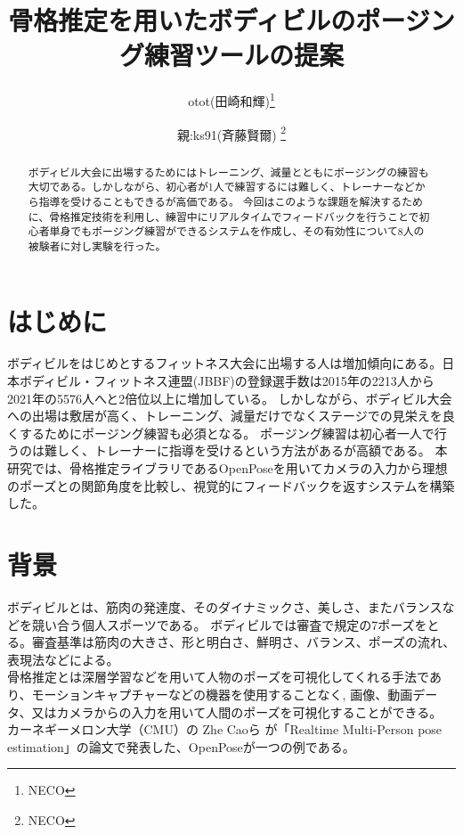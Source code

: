 \documentclass[a4j,10pt]{jsarticle}
\begin{document}

\title{骨格推定を用いたボディビルのポージング練習ツールの提案}

\author{
    otot(田崎和輝)\thanks{NECO}
    \and
    親:ks91(斉藤賢爾) \thanks{NECO}
}

\begin{abstract}
ボディビル大会に出場するためにはトレーニング、減量とともにポージングの練習も大切である。しかしながら、初心者が1人で練習するには難しく、トレーナーなどから指導を受けることもできるが高価である。
今回はこのような課題を解決するために、骨格推定技術を利用し、練習中にリアルタイムでフィードバックを行うことで初心者単身でもポージング練習ができるシステムを作成し、その有効性について8人の被験者に対し実験を行った。

\end{abstract}

\maketitle

\section{はじめに}
ボディビルをはじめとするフィットネス大会に出場する人は増加傾向にある。日本ボディビル・フィットネス連盟(JBBF)の登録選手数は2015年の2213人から2021年の5576人へと2倍位以上に増加している\cite{jbbf}。
しかしながら、ボディビル大会への出場は敷居が高く、トレーニング、減量だけでなくステージでの見栄えを良くするためにポージング練習も必須となる。
ポージング練習は初心者一人で行うのは難しく、トレーナーに指導を受けるという方法があるが高額である。
本研究では、骨格推定ライブラリであるOpenPoseを用いてカメラの入力から理想のポーズとの関節角度を比較し、視覚的にフィードバックを返すシステムを構築した。
\section{背景}
ボディビルとは、筋肉の発達度、そのダイナミックさ、美しさ、またバランスなどを競い合う個人スポーツである。\cite{bodybuilding}
ボディビルでは審査で規定の7ポーズをとる。審査基準は筋肉の大きさ、形と明白さ、鮮明さ、バランス、ポーズの流れ、表現法などによる。\\
\indent
骨格推定とは深層学習などを用いて人物のポーズを可視化してくれる手法であり、モーションキャプチャーなどの機器を使用することなく,
画像、動画データ、又はカメラからの入力を用いて人間のポーズを可視化することができる。
カーネギーメロン大学（CMU）の Zhe Caoら が「Realtime Multi-Person pose estimation」\cite{openpose}の論文で発表した、OpenPoseが一つの例である。
\end{document}
